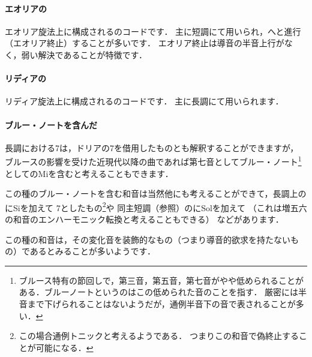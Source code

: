 \documentclass[dvipdfmx,uplatex,b5paper,openany,jbase=12Q,nomag*,textwidth-limit=44%
               ]{gachimuchi}[2020/05/05]
\begin{document}
\paragraph{エオリアの\Gnv\Min{}}
エオリア旋法上に構成される\Gnv\Min{}のコードです．
主に短調にて用いられ，\Gni\Min へと進行（エオリア終止）することが多いです．
エオリア終止は導音の半音上行がなく，弱い解決であることが特徴です．

\paragraph{リディアの\Gnii{}}
リディア旋法上に構成される\Gnii{}のコードです．
主に長調にて用いられます．

\paragraph{ブルー・ノートを含んだ\Gniv{}}
長調における\Gniv\subsc7は，ドリアの\Gniv\subsc7を借用したものとも解釈することができますが，
ブルースの影響を受けた近現代以降の曲であれば第七音としてブルー・ノート\footnote{%
  ブルース特有の節回しで，第三音，第五音，第七音がやや低められることがある．ブルーノートというのはこの低められた音のことを指す．
  厳密には半音まで下げられることはないようだが，通例半音下の音で表されることが多い．
}としてのMi\aFlat を含むと考えることもできます．

この種のブルー・ノートを含む和音は当然他にも考えることができて，長調上の\Gni にSi\aFlat を加えて
\Gni\subsc7としたもの\footnote{この場合通例トニックと考えるようである．
  つまりこの和音で偽終止することが可能になる．
}や
同主短調（参照）の\bFlat\Gnvi にSol\aFlat を加えて
\bFlat\Gnvi{}（これは増五六の和音のエンハーモニック転換と考えることもできる）
などがあります．

\begin{Music}[0.6\linewidth]
  \nostartrule%
  \Startpiece%
  \Notes%
  \en%
  \changecontext%
  \Notes
  \en
  \endpiece
\end{Music}

この種の和音は，その変化音を装飾的なもの（つまり導音的欲求を持たないもの）であるとみることが多いようです．
\end{document}

